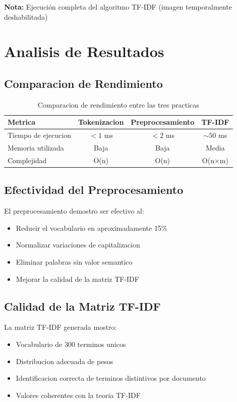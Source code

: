 \documentclass[12pt,a4paper]{article}
\begin{document}
\textbf{Nota:} Ejecución completa del algoritmo TF-IDF (imagen temporalmente deshabilitada)

\newpage

\section{Analisis de Resultados}

\subsection{Comparacion de Rendimiento}

\begin{table}[H]
    \centering
    \begin{tabular}{|l|c|c|c|}
        \hline
        \textbf{Metrica} & \textbf{Tokenizacion} & \textbf{Preprocesamiento} & \textbf{TF-IDF} \\
        \hline
        Tiempo de ejecucion & $< 1$ ms & $< 2$ ms & $\sim 50$ ms \\
        Memoria utilizada & Baja & Baja & Media \\
        Complejidad & O(n) & O(n) & O(n×m) \\
        \hline
    \end{tabular}
    \caption{Comparacion de rendimiento entre las tres practicas}
\end{table}

\subsection{Efectividad del Preprocesamiento}

El preprocesamiento demostro ser efectivo al:
\begin{itemize}
    \item Reducir el vocabulario en aproximadamente 15\%
    \item Normalizar variaciones de capitalizacion
    \item Eliminar palabras sin valor semantico
    \item Mejorar la calidad de la matriz TF-IDF
\end{itemize}

\subsection{Calidad de la Matriz TF-IDF}

La matriz TF-IDF generada mostro:
\begin{itemize}
    \item Vocabulario de 300 terminos unicos
    \item Distribucion adecuada de pesos
    \item Identificacion correcta de terminos distintivos por documento
    \item Valores coherentes con la teoria TF-IDF
\end{itemize}
\end{document}
